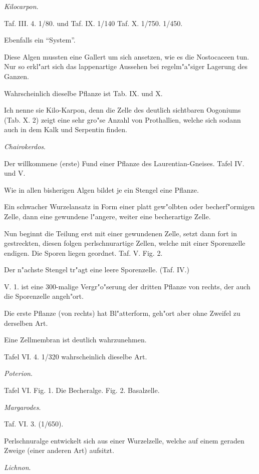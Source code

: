 \documentclass[a4paper, 11pt, oneside, german]{article}
\begin{document}
\centerline{\emph{Kilocarpon}.}

Taf. III. 4. 1/80. und Taf. IX. 1/140 Taf. X. 1/750. 1/450.

Ebenfalls ein "`System"'.

Diese Algen mussten eine Gallert um sich ansetzen, wie es die Nostocaceen tun. Nur so erkl"art sich das lappenartige Aussehen bei regelm"a"siger Lagerung des Ganzen.

Wahrscheinlich dieselbe Pflanze ist Tab. IX. und X.

Ich nenne sie Kilo-Karpon, denn die Zelle des deutlich sichtbaren Oogoniums (Tab. X. 2) zeigt eine sehr gro"se Anzahl von Prothallien, welche sich sodann auch in dem Kalk und Serpentin finden.

\centerline{\emph{Chairokerdos}.}

Der willkommene (erste) Fund einer Pflanze des Laurentian-Gneises. Tafel IV. und V.

Wie in allen bisherigen Algen bildet je ein Stengel eine Pflanze.

Ein schwacher Wurzelansatz in Form einer platt gew"olbten oder becherf"ormigen Zelle, dann eine gewundene l"angere, weiter eine becherartige Zelle.

Nun beginnt die Teilung erst mit einer gewundenen Zelle, setzt dann fort in gestreckten, diesen folgen perlschnurartige Zellen, welche mit einer Sporenzelle endigen. Die Sporen liegen geordnet. Taf. V. Fig. 2.

Der n"achste Stengel tr"agt eine leere Sporenzelle. (Taf. IV.)

V. 1. ist eine 300-malige Vergr"o"serung der dritten Pflanze von rechts, der auch die Sporenzelle angeh"ort.

Die erste Pflanze (von rechts) hat Bl"atterform, geh"ort aber ohne Zweifel zu derselben Art.

Eine Zellmembran ist deutlich wahrzunehmen.

Tafel VI. 4. 1/320 wahrscheinlich dieselbe Art.

\centerline{\emph{Poterion}.}

Tafel VI. Fig. 1. Die Becheralge. Fig. 2. Basalzelle.

\centerline{\emph{Margarodes}.}

Taf. VI. 3. (1/650).

Perlschnuralge entwickelt sich aus einer Wurzelzelle, welche auf einem geraden Zweige (einer anderen Art) aufsitzt.

\centerline{\emph{Lichnon}.}
\end{document}
